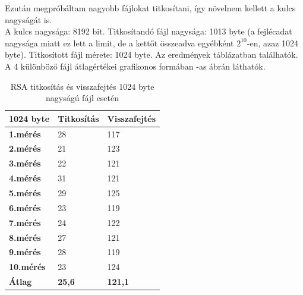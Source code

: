 \noindent Ezután megpróbáltam nagyobb fájlokat titkosítani, így növelnem kellett a kulcs nagyságát is.
\vspace{5pt} \\ A kulcs nagysága: 8192 bit. Titkosítandó fájl nagysága: 1013 byte (a fejlécadat nagysága miatt ez lett a limit, de a kettőt összeadva egyébként $2^{10}$-en, azaz 1024 byte). Titkosított fájl mérete: 1024 byte. Az eredmények   táblázatban találhatók. A 4 különböző fájl átlagértékei grafikonos formában -as ábrán láthatók.

\begin{table}[H]
	\centering
	\caption{RSA titkosítás és visszafejtés 1024 byte nagyságú fájl esetén}
	\label{tab:rsa_1024byte}
	\medskip
	\begin{tabular}{|p{2.4cm}|p{2.4cm}|p{2.4cm}|}
		\hline
		\textbf{1024 byte} & \textbf{Titkosítás} & \textbf{Visszafejtés}\\
		\hline
		\textbf{1.mérés} & 28 & 117\\
		\hline
		\textbf{2.mérés} & 21 & 123\\
		\hline
		\textbf{3.mérés} & 22 & 121\\
		\hline
		\textbf{4.mérés} & 31 & 121\\
		\hline
		\textbf{5.mérés} & 29 & 125\\
		\hline
		\textbf{6.mérés} & 23 & 119\\
		\hline
		\textbf{7.mérés} & 24 & 122\\
		\hline
		\textbf{8.mérés} & 27 & 121\\
		\hline
		\textbf{9.mérés} & 28 & 119\\
		\hline
		\textbf{10.mérés} & 23 & 124\\
		\hline
		\hline
		\textbf{Átlag} & \textbf{25,6} & \textbf{121,1}\\
		\hline
	\end{tabular}
\end{table}


